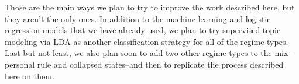 \documentclass[pdftex,12pt,fullpage,oneside]{amsart}
\begin{document}
Those are the main ways we plan to try to improve the work described here, but they aren't the only ones. In addition to the machine learning and logistic regression models that we have already used, we plan to try supervised topic modeling via LDA as another classification strategy for all of the regime types. Last but not least, we also plan soon to add two other regime types to the mix--personal rule and collapsed states--and then to replicate the process described here on them.



\end{document}
